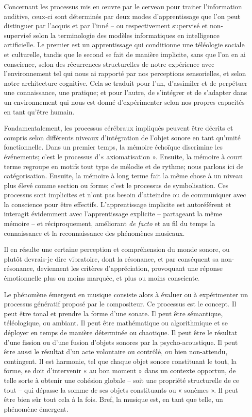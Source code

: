 \documentclass{article}
\begin{document}
Concernant les processus mis en œuvre par le cerveau pour traiter l'information auditive, ceux-ci sont déterminés par deux modes d'apprentissage que l'on peut distinguer par l'acquis et par l'inné -- ou respectivement supervisé et non-supervisé selon la terminologie des modèles informatiques en intelligence artificielle. Le premier est un apprentissage qui conditionne une téléologie sociale et culturelle, tandis que le second se fait de manière implicite, sans que l'on en ai conscience, selon des récurrences structurelles de notre expérience avec l'environnement tel qui nous ai rapporté par nos perceptions sensorielles, et selon notre architecture cognitive. Cela se traduit pour l'un, d'assimiler et de perpétuer une connaissance, une pratique; et pour l'autre, de s'intégrer et de s'adapter dans un environnement qui nous est donné d'expérimenter selon nos propres capacités en tant qu'être humain.

Fondamentalement, les processus cérébraux impliqués peuvent être décrits et compris selon différents niveaux d'intégration de l'objet sonore en tant qu'unité fonctionnelle. Dans un premier temps, la mémoire échoïque discrimine les événements; c'est le processus d'« axiomatisation ». Ensuite, la mémoire à court terme regroupe en motifs tout type de mélodie et de rythme; nous parlons ici de catégorisation. Ensuite, la mémoire à long terme fait la même chose à un niveau plus élevé comme section ou forme; c'est le processus de symbolisation. Ces processus sont implicites et n'ont pas besoin d'atteindre ou de communiquer avec la conscience pour être effectifs. L'apprentissage implicite est autoréférent et interagit évidemment avec l'apprentissage explicite -- partageant la même mémoire -- et réciproquement, améliorant \textit{de facto} et au fil du temps la connaissance et la reconnaissance des phénomènes musicaux.

Il en résulte une certaine perception et compréhension du monde sonore, ou plutôt devrais-je dire vibratoire, dont la résonance, et par conséquent sa non-résonance, deviennent les critères d'appréciation, provoquant une réponse émotionnelle plus ou moins marquée, et plus ou moins consciente.

\bigskip

Le phénomène émergent en musique consiste alors à évaluer ou à expérimenter un processus génératif proposé par le compositeur. Ce processus est le concept. Il peut être tonal et prendre la forme d'une sonate. Il peut être sémantique, téléologique, ou ambiant. Il peut être mathématique ou algorithmique et se déployer en temps de manière déterminée ou chaotique. Il peut être le résultat d'une fission ou d'une fusion d'objets sonores par la psycho-acoustique. Il peut être aussi le résultat d'un acte volontaire ou contrôlé, ou bien non-attendu, contingent. Il est harmonie, tel que chaque objet sonore constituant le tout, la forme, se doit d'intervenir « au bon moment » dans un contexte opportun, de telle sorte à obtenir une cohésion globale -- soit une propriété structurelle de ce tout -- qui dépasse la somme de ses objets constituants ou « sonèmes ». Il peut être bien sûr tout cela à la fois. Bref, la musique est, en tant que telle, un phénomène émergent.
\end{document}
